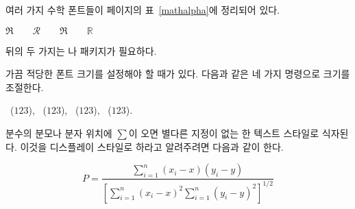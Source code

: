 여러 가지 수학 폰트들이 \pageref{mathalpha} 페이지의 표~\ref{mathalpha}에 정리되어 있다.
\begin{example}
 $\Re \qquad
  \mathcal{R} \qquad
  \mathfrak{R} \qquad
  \mathbb{R} \qquad $  
\end{example}
\noindent 뒤의 두 가지는 나  패키지가 필요하다.

가끔 적당한 폰트 크기를 설정해야 할 때가 있다. 다음과 같은 네 가지 명령으로 크기를 조절한다.
\begin{flushleft}
~($\displaystyle 123$),
 ~($\textstyle 123$), 
~($\scriptstyle 123$),
~($\scriptscriptstyle 123$).
\end{flushleft}

분수의 분모나 분자 위치에 $\sum$이 오면 별다른 지정이 없는 한 텍스트 스타일로 식자된다.
이것을 디스플레이 스타일로 하라고 알려주려면 다음과 같이 한다.
\begin{example}
\begin{equation*}
 P = \frac{\displaystyle{ 
   \sum_{i=1}^n (x_i- x)
   (y_i- y)}} 
   {\displaystyle{\left[
   \sum_{i=1}^n(x_i-x)^2
   \sum_{i=1}^n(y_i- y)^2
   \right]^{1/2}}}
\end{equation*}    
\end{example}

